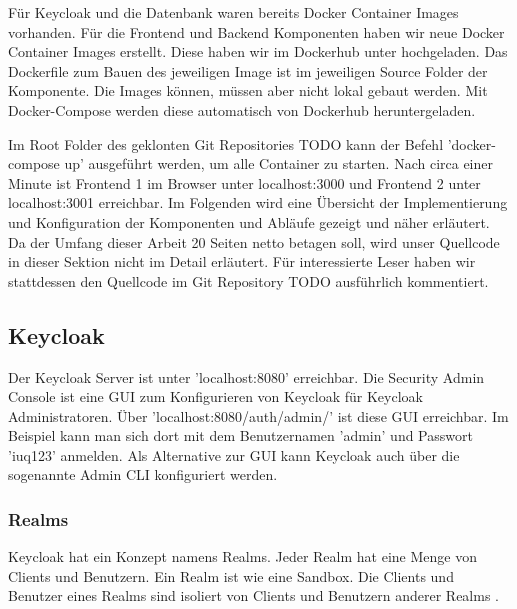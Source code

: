 Für Keycloak und die Datenbank waren bereits Docker Container Images vorhanden. Für die Frontend und Backend Komponenten haben wir neue Docker Container Images erstellt. Diese haben wir im Dockerhub unter \cite{EB42} hochgeladen. Das Dockerfile zum Bauen des jeweiligen Image ist im jeweiligen Source Folder der Komponente. Die Images können, müssen aber nicht lokal gebaut werden. Mit Docker-Compose werden diese automatisch von Dockerhub heruntergeladen.

Im Root Folder des geklonten Git Repositories TODO kann der Befehl 'docker-compose up' ausgeführt werden, um alle Container zu starten. Nach circa einer Minute ist Frontend 1 im Browser unter localhost:3000 und Frontend 2 unter localhost:3001 erreichbar. Im Folgenden wird eine Übersicht der Implementierung und Konfiguration der Komponenten und Abläufe gezeigt und näher erläutert. Da der Umfang dieser Arbeit 20 Seiten netto betagen soll, wird unser Quellcode in dieser Sektion nicht im Detail erläutert. Für interessierte Leser haben wir stattdessen den Quellcode im Git Repository TODO ausführlich kommentiert.


\subsection{Keycloak} \label{EB_Keycloak}

Der Keycloak Server ist unter 'localhost:8080' erreichbar. Die Security Admin Console ist eine GUI zum Konfigurieren von Keycloak für Keycloak Administratoren. Über 'localhost:8080/auth/admin/' ist diese GUI erreichbar. Im Beispiel kann man sich dort mit dem Benutzernamen 'admin' und Passwort 'iuq123' anmelden. Als Alternative zur GUI kann Keycloak auch über die sogenannte Admin CLI konfiguriert werden.

\subsubsection{Realms}

Keycloak hat ein Konzept namens Realms. Jeder Realm hat eine Menge von Clients und Benutzern. Ein Realm ist wie eine Sandbox. Die Clients und Benutzer eines Realms sind isoliert von Clients und Benutzern anderer Realms \cite{EB46}.


